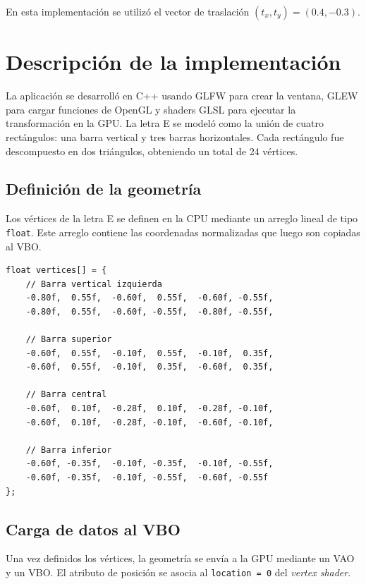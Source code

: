\documentclass[12pt,a4paper]{article}
\begin{document}
En esta implementaci\'on se utiliz\'o el vector de traslaci\'on $(t_x, t_y) = (0.4, -0.3)$.

\section{Descripci\'on de la implementaci\'on}

La aplicaci\'on se desarroll\'o en C++ usando GLFW para crear la ventana, GLEW para cargar funciones de OpenGL y shaders GLSL para ejecutar la transformaci\'on en la GPU. La letra E se model\'o como la uni\'on de cuatro rect\'angulos: una barra vertical y tres barras horizontales. Cada rect\'angulo fue descompuesto en dos tri\'angulos, obteniendo un total de 24 v\'ertices.

\subsection{Definici\'on de la geometr\'ia}

Los v\'ertices de la letra E se definen en la CPU mediante un arreglo lineal de tipo \texttt{float}. Este arreglo contiene las coordenadas normalizadas que luego son copiadas al VBO.

\begin{lstlisting}[style=cppstyle,caption={Fragmento de definici\'on de v\'ertices de la letra E}]
float vertices[] = {
	// Barra vertical izquierda
	-0.80f,  0.55f,  -0.60f,  0.55f,  -0.60f, -0.55f,
	-0.80f,  0.55f,  -0.60f, -0.55f,  -0.80f, -0.55f,

	// Barra superior
	-0.60f,  0.55f,  -0.10f,  0.55f,  -0.10f,  0.35f,
	-0.60f,  0.55f,  -0.10f,  0.35f,  -0.60f,  0.35f,

	// Barra central
	-0.60f,  0.10f,  -0.28f,  0.10f,  -0.28f, -0.10f,
	-0.60f,  0.10f,  -0.28f, -0.10f,  -0.60f, -0.10f,

	// Barra inferior
	-0.60f, -0.35f,  -0.10f, -0.35f,  -0.10f, -0.55f,
	-0.60f, -0.35f,  -0.10f, -0.55f,  -0.60f, -0.55f
};
\end{lstlisting}

\subsection{Carga de datos al VBO}

Una vez definidos los v\'ertices, la geometr\'ia se env\'ia a la GPU mediante un VAO y un VBO. El atributo de posici\'on se asocia al \texttt{location = 0} del \textit{vertex shader}.
\end{document}
